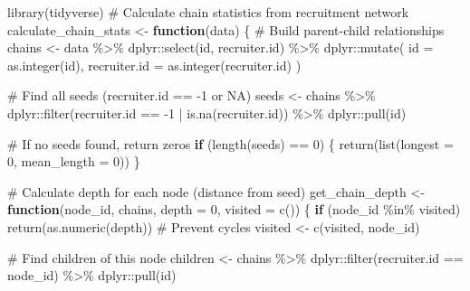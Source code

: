\documentclass[
  12pt,
  letterpaper,
  DIV=11,
  numbers=noendperiod]{scrartcl}
\newenvironment{Shaded}{\begin{snugshade}}{\end{snugshade}}
\newcommand{\AttributeTok}[1]{\textcolor[rgb]{0.40,0.45,0.13}{#1}}
\newcommand{\CommentTok}[1]{\textcolor[rgb]{0.37,0.37,0.37}{#1}}
\newcommand{\ControlFlowTok}[1]{\textcolor[rgb]{0.00,0.23,0.31}{\textbf{#1}}}
\newcommand{\DecValTok}[1]{\textcolor[rgb]{0.68,0.00,0.00}{#1}}
\newcommand{\FunctionTok}[1]{\textcolor[rgb]{0.28,0.35,0.67}{#1}}
\newcommand{\NormalTok}[1]{\textcolor[rgb]{0.00,0.23,0.31}{#1}}
\newcommand{\OtherTok}[1]{\textcolor[rgb]{0.00,0.23,0.31}{#1}}
\newcommand{\SpecialCharTok}[1]{\textcolor[rgb]{0.37,0.37,0.37}{#1}}
\theoremstyle{plain}
\theoremstyle{definition}
\begin{document}
\begin{Shaded}
\begin{Highlighting}[]
\FunctionTok{library}\NormalTok{(tidyverse)}
\CommentTok{\# Calculate chain statistics from recruitment network}
\NormalTok{calculate\_chain\_stats }\OtherTok{\textless{}{-}} \ControlFlowTok{function}\NormalTok{(data) \{}
  \CommentTok{\# Build parent{-}child relationships}
\NormalTok{  chains }\OtherTok{\textless{}{-}}\NormalTok{ data }\SpecialCharTok{\%\textgreater{}\%}
\NormalTok{    dplyr}\SpecialCharTok{::}\FunctionTok{select}\NormalTok{(id, recruiter.id) }\SpecialCharTok{\%\textgreater{}\%}
\NormalTok{    dplyr}\SpecialCharTok{::}\FunctionTok{mutate}\NormalTok{(}
      \AttributeTok{id =} \FunctionTok{as.integer}\NormalTok{(id),}
      \AttributeTok{recruiter.id =} \FunctionTok{as.integer}\NormalTok{(recruiter.id)}
\NormalTok{    )}

  \CommentTok{\# Find all seeds (recruiter.id == {-}1 or NA)}
\NormalTok{  seeds }\OtherTok{\textless{}{-}}\NormalTok{ chains }\SpecialCharTok{\%\textgreater{}\%}
\NormalTok{    dplyr}\SpecialCharTok{::}\FunctionTok{filter}\NormalTok{(recruiter.id }\SpecialCharTok{==} \SpecialCharTok{{-}}\DecValTok{1} \SpecialCharTok{|} \FunctionTok{is.na}\NormalTok{(recruiter.id)) }\SpecialCharTok{\%\textgreater{}\%}
\NormalTok{    dplyr}\SpecialCharTok{::}\FunctionTok{pull}\NormalTok{(id)}

  \CommentTok{\# If no seeds found, return zeros}
  \ControlFlowTok{if}\NormalTok{ (}\FunctionTok{length}\NormalTok{(seeds) }\SpecialCharTok{==} \DecValTok{0}\NormalTok{) \{}
    \FunctionTok{return}\NormalTok{(}\FunctionTok{list}\NormalTok{(}\AttributeTok{longest =} \DecValTok{0}\NormalTok{, }\AttributeTok{mean\_length =} \DecValTok{0}\NormalTok{))}
\NormalTok{  \}}

  \CommentTok{\# Calculate depth for each node (distance from seed)}
\NormalTok{  get\_chain\_depth }\OtherTok{\textless{}{-}} \ControlFlowTok{function}\NormalTok{(node\_id, chains, }\AttributeTok{depth =} \DecValTok{0}\NormalTok{, }\AttributeTok{visited =} \FunctionTok{c}\NormalTok{()) \{}
    \ControlFlowTok{if}\NormalTok{ (node\_id }\SpecialCharTok{\%in\%}\NormalTok{ visited) }\FunctionTok{return}\NormalTok{(}\FunctionTok{as.numeric}\NormalTok{(depth))  }\CommentTok{\# Prevent cycles}
\NormalTok{    visited }\OtherTok{\textless{}{-}} \FunctionTok{c}\NormalTok{(visited, node\_id)}

    \CommentTok{\# Find children of this node}
\NormalTok{    children }\OtherTok{\textless{}{-}}\NormalTok{ chains }\SpecialCharTok{\%\textgreater{}\%}
\NormalTok{      dplyr}\SpecialCharTok{::}\FunctionTok{filter}\NormalTok{(recruiter.id }\SpecialCharTok{==}\NormalTok{ node\_id) }\SpecialCharTok{\%\textgreater{}\%}
\NormalTok{      dplyr}\SpecialCharTok{::}\FunctionTok{pull}\NormalTok{(id)}


\end{Highlighting}
\end{Shaded}
\end{document}
